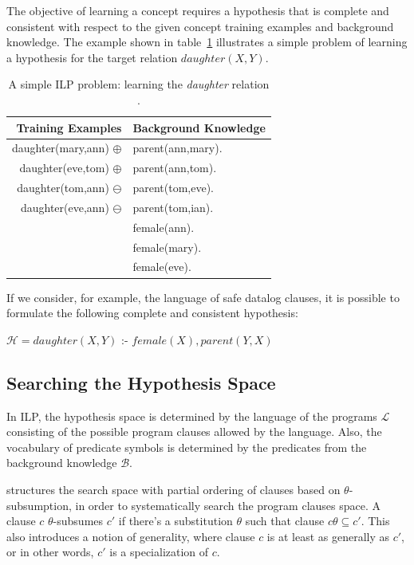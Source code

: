 The objective of learning a concept requires a hypothesis that is complete and consistent with respect to the given
concept training examples and background knowledge. The example shown in table~\ref{tab:ilpExample} illustrates a simple
problem of learning a hypothesis for the target relation
$daughter(X,Y)$.

\begin{table}[h!]
\caption{A simple ILP problem: learning the \emph{daughter} relation \citep{DBLP:journals/ml/LavracD96} .}
  \begin{center}
      \begin{tabular}{ r | l }
      \toprule
      \textbf{Training Examples} & \textbf{Background Knowledge}\\
      \midrule
      daughter(mary,ann) $\oplus$	& parent(ann,mary).	\\
      daughter(eve,tom) $\oplus$	& parent(ann,tom).	\\
      daughter(tom,ann) $\ominus$ 	& parent(tom,eve).	\\
      daughter(eve,ann) $\ominus$	& parent(tom,ian).	\\
					& female(ann).		\\
					& female(mary).		\\
					& female(eve).		\\
      \bottomrule
      \end{tabular}
  \label{tab:ilpExample}
  \end{center}
\end{table}

If we consider, for example, the language of safe datalog clauses, it is possible to formulate the following complete
and consistent hypothesis:

\begin{center}
  $\mathcal{H} = daughter(X,Y)$ :- $female(X),parent(Y,X)$ 
\end{center}

\subsection{Searching the Hypothesis Space}

In ILP, the hypothesis space is determined by the language of the programs $\mathcal{L}$ consisting of the possible
program clauses allowed by the language. Also, the vocabulary of predicate symbols is determined by the predicates
from the background knowledge $\mathcal{B}$.

\citet{DBLP:journals/ml/LavracD96} structures the search space with partial ordering of clauses based on
$\theta$-subsumption, in order to systematically search the program clauses space. A clause $c$ $\theta$-subsumes $c'$
if there's a substitution $\theta$ such that clause $c\theta \subseteq c'$. This also introduces a notion of generality,
where clause $c$ is at least as generally as $c'$, or in other words, $c'$ is a specialization of $c$.

